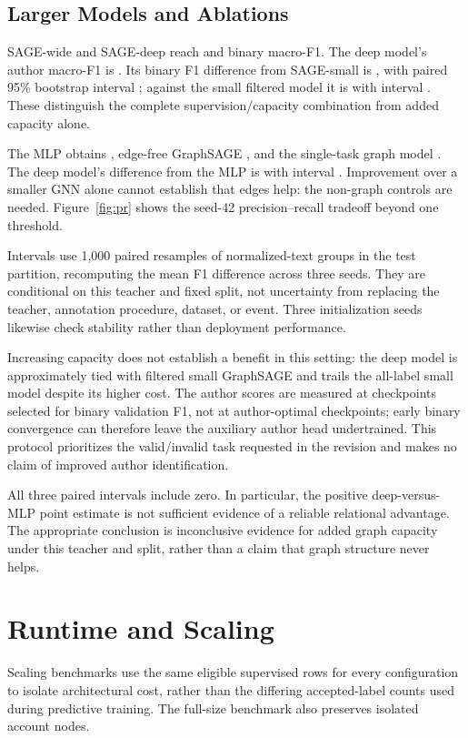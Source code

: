 \documentclass[conference]{IEEEtran}
\begin{document}
\subsection{Larger Models and Ablations}
SAGE-wide and SAGE-deep reach \WideFOne{} and \LargeFOne{} binary macro-F1. The deep model's author macro-F1 is \LargeAuthorFOne{}. Its binary F1 difference from SAGE-small is \SmallDelta{}, with paired 95\% bootstrap interval \SmallDeltaCI{}; against the small filtered model it is \FilteredDelta{} with interval \FilteredDeltaCI{}. These distinguish the complete supervision/capacity combination from added capacity alone.

The MLP obtains \MLPFOne{}, edge-free GraphSAGE \NoEdgesFOne{}, and the single-task graph model \SingleFOne{}. The deep model's difference from the MLP is \MLPDelta{} with interval \MLPDeltaCI{}. Improvement over a smaller GNN alone cannot establish that edges help: the non-graph controls are needed. Figure~\ref{fig:pr} shows the seed-42 precision--recall tradeoff beyond one threshold.

Intervals use 1,000 paired resamples of normalized-text groups in the test partition, recomputing the mean F1 difference across three seeds. They are conditional on this teacher and fixed split, not uncertainty from replacing the teacher, annotation procedure, dataset, or event. Three initialization seeds likewise check stability rather than deployment performance.

Increasing capacity does not establish a benefit in this setting: the deep model is approximately tied with filtered small GraphSAGE and trails the all-label small model despite its higher cost. The author scores are measured at checkpoints selected for binary validation F1, not at author-optimal checkpoints; early binary convergence can therefore leave the auxiliary author head undertrained. This protocol prioritizes the valid/invalid task requested in the revision and makes no claim of improved author identification.

All three paired intervals include zero. In particular, the positive deep-versus-MLP point estimate is not sufficient evidence of a reliable relational advantage. The appropriate conclusion is inconclusive evidence for added graph capacity under this teacher and split, rather than a claim that graph structure never helps.

\section{Runtime and Scaling}


Scaling benchmarks use the same eligible supervised rows for every configuration to isolate architectural cost, rather than the differing accepted-label counts used during predictive training. The full-size benchmark also preserves isolated account nodes.
\end{document}
